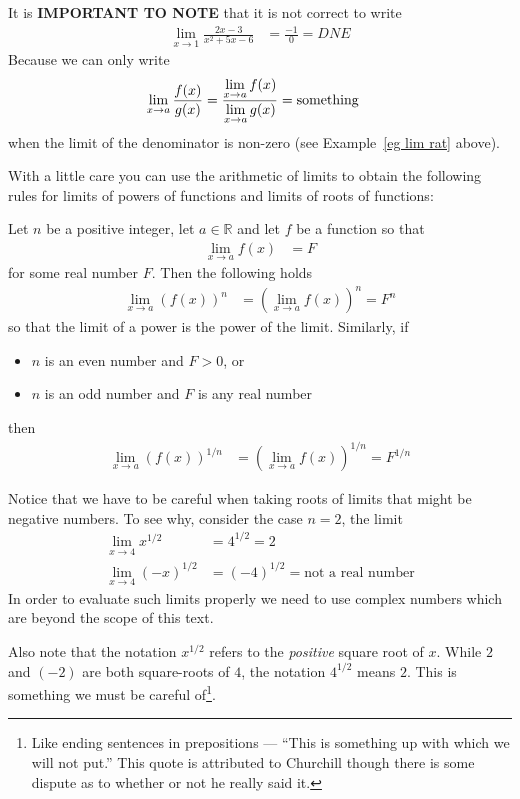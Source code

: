 It is \textbf{IMPORTANT TO NOTE} that it is not correct to write
\begin{align*}
\lim_{x \to 1} \frac{2x-3}{x^2+5x-6}
  &= \frac{-1}{0} = DNE
\end{align*}
Because we can only write
\begin{align*}
  \lim_{x \to a} \frac{f(x)}{g(x)} &= \frac{\displaystyle \lim_{x \to a} f(x)}{\displaystyle
\lim_{x \to a} g(x) } = \text{something}
\end{align*}
when the limit of the denominator is non-zero (see Example~\ref{eg lim rat} above).

With a little care you can use the arithmetic of limits to obtain the
following rules for limits of powers of functions and limits of roots of
functions:
\begin{theorem}
\label{thm lim powers}
  Let $n$ be a positive integer, let $a \in \mathbb{R}$ and let $f$ be a
function so that
\begin{align*}
  \lim_{x \to a} f(x) &= F
\end{align*}
  for some real number $F$. Then the following holds
\begin{align*}
  \lim_{x \to a} \left( f(x) \right)^n
  &= \left(\lim_{x \to a} f(x) \right)^n = F^n
\end{align*}
so that the limit of a power is the power of the limit. Similarly, if
\begin{itemize}
 \item $n$ is an even number and $F>0$, or
 \item $n$ is an odd number and $F$ is any real number
\end{itemize}
then
\begin{align*}
  \lim_{x \to a} \left( f(x) \right)^{1/n}
  &= \left(\lim_{x \to a} f(x) \right)^{1/n} = F^{1/n}
\end{align*}
\end{theorem}
Notice that we have to be careful when taking roots of limits that might be
negative numbers. To see why, consider the case $n=2$, the limit
\begin{align*}
  \lim_{x \to 4} x^{1/2} &= 4^{1/2} = 2 \\
  \lim_{x \to 4} (-x)^{1/2} &= (-4)^{1/2} = \text{not a real number}
\end{align*}
In order to evaluate such limits properly we need to use complex numbers which
are beyond the scope of this text.

Also note that the notation $x^{1/2}$ refers to the \emph{positive} square root
of $x$. While $2$ and $(-2)$ are both square-roots of $4$, the notation
$4^{1/2}$ means $2$. This is something we must be careful of\footnote{Like
ending sentences in prepositions --- ``This is something up with which we will
not put.'' This quote is attributed to Churchill though there is some dispute as to
whether or not he really said it.}.


